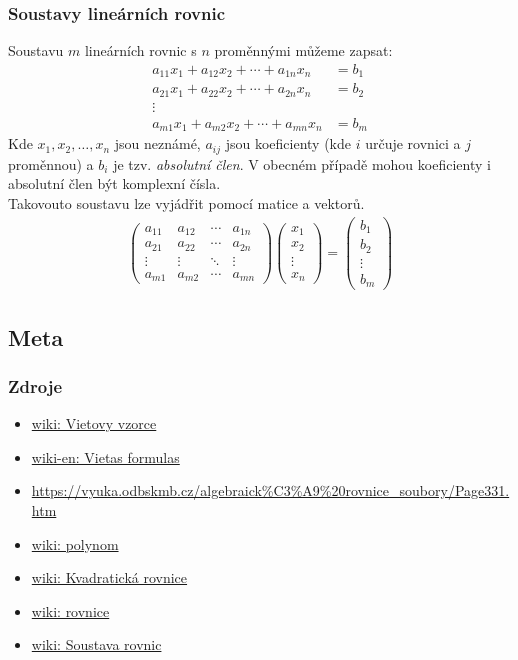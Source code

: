 \documentclass[12pt]{article}
\begin{document}
\subsubsection{Soustavy lineárních rovnic}
Soustavu $m$ lineárních rovnic s $n$ proměnnými můžeme zapsat:
\begin{align}
a_{11}x_1 + a_{12}x_2 + \dotsb + a_{1n}x_n &= b_1\\
a_{21}x_1 + a_{22}x_2 + \dotsb + a_{2n}x_n &= b_2 \\
\vdots \\
a_{m1}x_1 + a_{m2}x_2 + \dotsb + a_{mn}x_n &= b_m
\end{align}
Kde $x_1, x_2, \dotsc , x_n$ jsou neznámé, $a_{ij}$ jsou koeficienty (kde $i$ určuje rovnici a $j$ proměnnou) a $b_i$ je tzv. \emph{absolutní člen}. V obecném případě mohou koeficienty i absolutní člen být komplexní čísla.\\
Takovouto soustavu lze vyjádřit pomocí matice a vektorů.
\begin{align}
{\begin{pmatrix}a_{11}&a_{12}&\cdots &a_{1n}\\a_{21}&a_{22}&\cdots &a_{2n}\\\vdots &\vdots &\ddots &\vdots \\a_{m1}&a_{m2}&\cdots &a_{mn}\end{pmatrix}}{\begin{pmatrix}x_{1}\\x_{2}\\\vdots \\x_{n}\end{pmatrix}}={\begin{pmatrix}b_{1}\\b_{2}\\\vdots \\b_{m}\end{pmatrix}}
\end{align}
\subsection{Meta}
\subsubsection{Zdroje}
\begin{itemize}
\item \href{https://cs.wikipedia.org/wiki/Vi\%C3\%A8tovy_vzorce}{wiki: Vietovy vzorce}
\item \href{https://en.wikipedia.org/wiki/Vieta\%27s_formulas}{wiki-en: Vietas formulas}
\item \url{https://vyuka.odbskmb.cz/algebraick\%C3\%A9\%20rovnice_soubory/Page331.htm}
\item \href{https://cs.wikipedia.org/wiki/Polynom}{wiki: polynom}
\item \href{https://cs.wikipedia.org/wiki/Kvadratick\%C3\%A1_rovnice}{wiki: Kvadratická rovnice}
\item \href{https://cs.wikipedia.org/wiki/Rovnice}{wiki: rovnice}
\item \href{https://cs.wikipedia.org/wiki/Soustava_rovnic}{wiki: Soustava rovnic}
\end{itemize}
\end{document}
